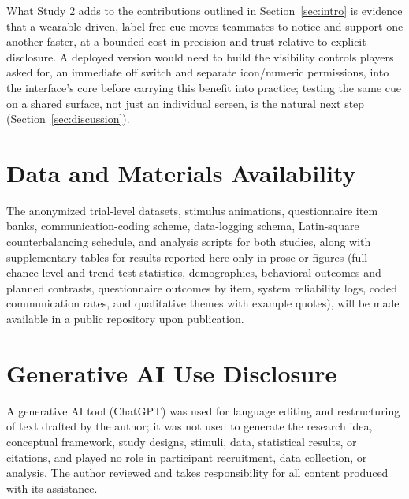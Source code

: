 \documentclass[manuscript,review,anonymous]{acmart}
\begin{document}
What Study 2 adds to the contributions outlined in Section~\ref{sec:intro} is evidence that a wearable-driven, label free cue moves teammates to notice and support one another faster, at a bounded cost in precision and trust relative to explicit disclosure. A deployed version would need to build the visibility controls players asked for, an immediate off switch and separate icon/numeric permissions, into the interface's core before carrying this benefit into practice; testing the same cue on a shared surface, not just an individual screen, is the natural next step (Section~\ref{sec:discussion}).

\section{Data and Materials Availability}
\label{sec:data-availability}
The anonymized trial-level datasets, stimulus animations, questionnaire item banks, communication-coding scheme, data-logging schema, Latin-square counterbalancing schedule, and analysis scripts for both studies, along with supplementary tables for results reported here only in prose or figures (full chance-level and trend-test statistics, demographics, behavioral outcomes and planned contrasts, questionnaire outcomes by item, system reliability logs, coded communication rates, and qualitative themes with example quotes), will be made available in a public repository upon publication.

\section{Generative AI Use Disclosure}
A generative AI tool (ChatGPT) was used for language editing and restructuring of text drafted by the author; it was not used to generate the research idea, conceptual framework, study designs, stimuli, data, statistical results, or citations, and played no role in participant recruitment, data collection, or analysis. The author reviewed and takes responsibility for all content produced with its assistance.


\FloatBarrier  %



\end{document}
